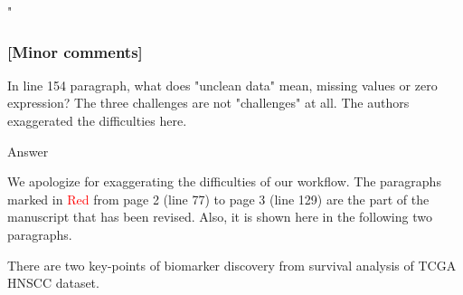 \documentclass[preprint,12pt]{elsarticle}
\newenvironment{MyColorPar}[1]{%
    \leavevmode\color{#1}\ignorespaces%
}{%
}%
\begin{document}
\begin{MyColorPar}{blue}
\begin{MyColorPar}{red}






%
"

\end{MyColorPar}


\begin{MyColorPar}{black} %
\subsubsection*{[Minor comments]}

In line 154 paragraph, what does "unclean data" mean, missing values or zero expression? 
The three challenges are not "challenges" at all. The authors exaggerated the difficulties here.\\[0.3cm]
\end{MyColorPar}

Answer

We apologize for exaggerating the difficulties of our workflow.
The paragraphs marked in \textcolor{red}{Red} from page 2 (line 77) to page 3 (line 129) are the part of the manuscript that has been revised. Also, it is shown here in the following two paragraphs.

\begin{MyColorPar}{red}
There are two key-points of biomarker discovery from survival analysis of TCGA HNSCC dataset.


\end{MyColorPar}
\end{MyColorPar}
\end{document}
